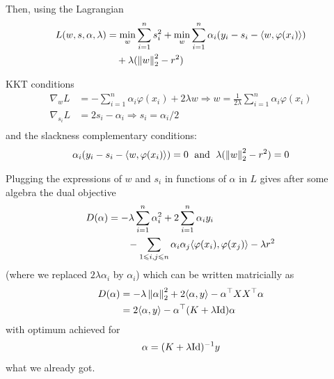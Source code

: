 \documentclass[xcolor={usenames,dvipsnames}]{beamer}
\begin{document}
\begin{frame}{Then, using the Lagrangian}
 \vspace{-0.5cm}
  \begin{align*}
    L(w, s, \alpha, \lambda) &= \min_{w} \sum_{i=1}^n s_i^2 
    + \min_{w} \sum_{i=1}^n \alpha_i (y_i - s_i - \langle w, \varphi(x_i) \rangle) \\
      &\quad + \lambda (\left\| w \right\|_2^2 - r^2)
  \end{align*}
  \pause 
  \begin{block}{KKT conditions}
  \begin{align*}
      \nabla_w L &= - \sum_{i=1}^n \alpha_i \varphi(x_i) + 2 \lambda w \Rightarrow w 
      = \frac{1}{2 \lambda}  \sum_{i=1}^n \alpha_i \varphi(x_i) \\
      \nabla_{s_i} L &= 2 s_i - \alpha_i \Rightarrow s_i = \alpha_i / 2 \\
  \end{align*}
  and the slackness complementary conditions:
  \begin{align*}
    \alpha_i (y_i - s_i - \langle w, \varphi(x_i) \rangle) = 0 \; \text{ and } \; 
    \lambda (\left\| w \right\|_2^2 - r^2) = 0
  \end{align*}
  \end{block}
  \end{frame}
  


\begin{frame}{}
  Plugging the expressions of $w$ and $s_i$ in functions of $\alpha$ in $L$ gives after some algebra the dual objective
  \begin{align*}
      D(\alpha) &= - \lambda \sum_{i=1}^n \alpha_i^2 + 2 \sum_{i=1}^n \alpha_i y_i \\
      & \quad \quad - \sum_{1 \leqslant i, j \leqslant n} \alpha_i \alpha_j 
      \langle \varphi(x_i), \varphi(x_j) \rangle - \lambda r^2
  \end{align*}
  (where we replaced $2 \lambda \alpha_i$ by $\alpha_i$)
\pause   
   which can be written matricially as
  \begin{align*}
    D(\alpha) &= - \lambda \left\| \alpha \right\|_2^2 + 2 \langle \alpha, y \rangle - 
    \alpha^\top X X^\top \alpha \\
    &= 2 \langle \alpha, y \rangle - \alpha^\top (K + \lambda \mathrm{Id}) \alpha
  \end{align*}
  \pause 
  with optimum achieved for
  \begin{equation*}
    \alpha =  (K + \lambda \mathrm{Id})^{-1} y
  \end{equation*}
what we already got.
\end{frame}
\end{document}

